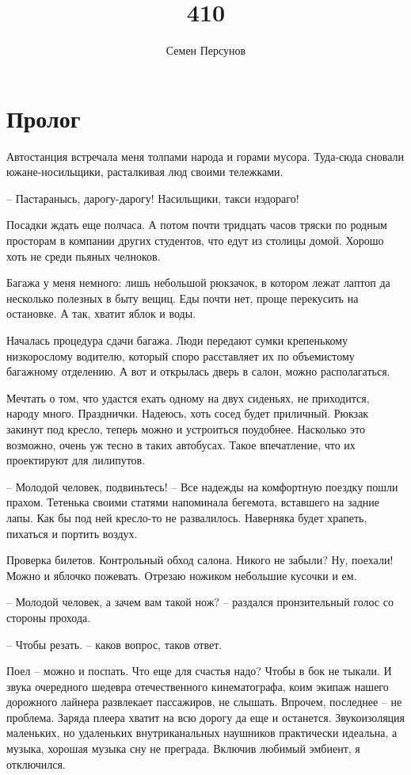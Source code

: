 \documentclass[a4paper]{book}
\title{410}
\author{Семен Персунов}
\begin{document}
 
\maketitle

\tableofcontents


\chapter{Пролог}
Автостанция встречала меня толпами народа и горами мусора. Туда-сюда сновали южане-носильщики, расталкивая люд своими тележками. 
 
-- Пастаранысь, дарогу-дарогу! Насильщики, такси нэдораго!

Посадки ждать еще полчаса. А потом почти тридцать часов тряски по родным просторам в компании других студентов, что едут из столицы домой. Хорошо хоть не среди пьяных челноков.

Багажа у меня немного: лишь небольшой рюкзачок, в котором лежат лаптоп да несколько полезных в быту вещиц. Еды почти нет, проще перекусить на остановке. А так, хватит яблок и  воды. 

Началась процедура сдачи багажа. Люди передают сумки крепенькому низкорослому водителю, который споро расставляет их по объемистому багажному отделению. А вот и открылась дверь в салон, можно располагаться. 

Мечтать о том, что удастся ехать одному на двух сиденьях, не приходится, народу много. Празднички. Надеюсь, хоть сосед будет приличный. Рюкзак закинут под кресло, теперь можно и устроиться поудобнее. Насколько это возможно, очень уж тесно в таких автобусах. Такое впечатление, что их проектируют для лилипутов.

-- Молодой человек, подвиньтесь! -- Все надежды на комфортную поездку пошли прахом. Тетенька своими статями напоминала бегемота, вставшего на задние лапы. Как бы под ней кресло-то не развалилось. Наверняка будет храпеть, пихаться и портить воздух. 

Проверка билетов. Контрольный обход салона. Никого не забыли? Ну, поехали! Можно и яблочко пожевать. Отрезаю ножиком небольшие кусочки и ем. 

-- Молодой человек, а зачем вам такой нож? -- раздался пронзительный голос со стороны прохода.

-- Чтобы резать. -- каков вопрос, таков ответ.

Поел -- можно и поспать. Что еще для счастья надо? Чтобы в бок не тыкали. И звука очередного шедевра отечественного кинематографа, коим экипаж нашего дорожного лайнера развлекает пассажиров, не слышать. Впрочем, последнее -- не проблема. Заряда плеера хватит на всю дорогу да еще и останется. Звукоизоляция маленьких, но удаленьких внутриканальных наушников практически идеальна, а музыка, хорошая музыка сну не преграда. Включив любимый эмбиент, я отключился.
\end{document}
